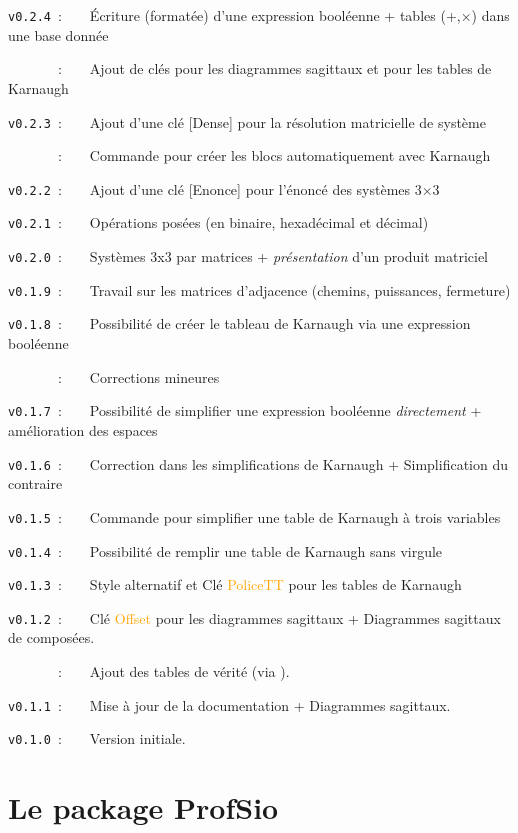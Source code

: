 \documentclass[french,a4paper,11pt]{article}
\newcommand\Cle[1]{{\small\sffamily\textlangle \textcolor{orange}{#1}\textrangle}}
\begin{document}
{{\verb|v0.2.4|~:~~~~Écriture (formatée) d'une expression booléenne + tables (+,×) dans une base donnée

\verb|      |~:~~~~Ajout de clés pour les diagrammes sagittaux et pour les tables de Karnaugh

\verb|v0.2.3|~:~~~~Ajout d'une clé [Dense] pour la résolution matricielle de système

\verb|      |~:~~~~Commande pour créer les blocs automatiquement avec Karnaugh

\verb|v0.2.2|~:~~~~Ajout d'une clé \textsf{[Enonce]} pour l'énoncé des systèmes 3×3

\verb|v0.2.1|~:~~~~Opérations posées (en binaire, hexadécimal et décimal)

\verb|v0.2.0|~:~~~~Systèmes 3x3 par matrices + \textit{présentation} d'un produit matriciel

\verb|v0.1.9|~:~~~~Travail sur les matrices d'adjacence (chemins, puissances, fermeture)

\verb|v0.1.8|~:~~~~Possibilité de créer le tableau de Karnaugh via une expression booléenne

\verb|      |~:~~~~Corrections mineures

\verb|v0.1.7|~:~~~~Possibilité de simplifier une expression booléenne \textit{directement} + amélioration des espaces

\verb|v0.1.6|~:~~~~Correction dans les simplifications de Karnaugh + Simplification du contraire

\verb|v0.1.5|~:~~~~Commande pour simplifier une table de Karnaugh à trois variables

\verb|v0.1.4|~:~~~~Possibilité de remplir une table de Karnaugh sans virgule

\verb|v0.1.3|~:~~~~Style alternatif et Clé \Cle{PoliceTT} pour les tables de Karnaugh

\verb|v0.1.2|~:~~~~Clé \Cle{Offset} pour les diagrammes sagittaux + Diagrammes sagittaux de composées.

\verb|      |~:~~~~Ajout des tables de vérité (via ).

\verb|v0.1.1|~:~~~~Mise à jour de la documentation + Diagrammes sagittaux.

\verb|v0.1.0|~:~~~~Version initiale.

\newpage

\section{Le package ProfSio}

}}
\end{document}
